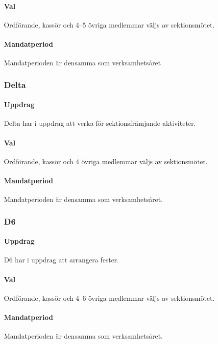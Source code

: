 \paragraph{Val}
Ordförande, kassör och 4--5 övriga medlemmar väljs av sektionsmötet.

\paragraph{Mandatperiod}
Mandatperioden är densamma som verksamhetsåret

\subsubsection{Delta}

\paragraph{Uppdrag}
Delta har i uppdrag att verka för sektionsfrämjande aktiviteter. 

\paragraph{Val}
Ordförande, kassör och 4 övriga medlemmar väljs av sektionsmötet. 

\paragraph{Mandatperiod}
Mandatperioden är densamma som verksamhetsåret. 

\subsubsection{D6}

\paragraph{Uppdrag}
D6 har i uppdrag att arrangera fester. 

\paragraph{Val}
Ordförande, kassör och 4--6 övriga medlemmar väljs av sektionsmötet. 

\paragraph{Mandatperiod}
Mandatperioden är densamma som verksamhetsåret. 

